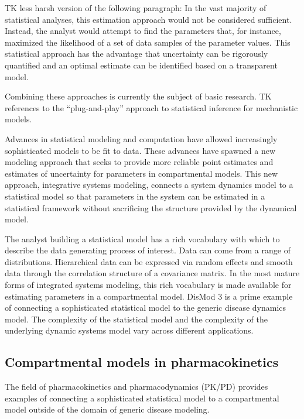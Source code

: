TK less harsh version of the following paragraph: In the vast majority
of statistical analyses, this estimation approach would not be
considered sufficient. Instead, the analyst would attempt to find the
parameters that, for instance, maximized the likelihood of a set of
data samples of the parameter values. This statistical approach has
the advantage that uncertainty can be rigorously quantified and an
optimal estimate can be identified based on a transparent model.

Combining these approaches is currently the subject of basic research.
TK references to the ``plug-and-play'' approach to statistical
inference for mechanistic models.

Advances in statistical modeling and computation have allowed
increasingly sophisticated models to be fit to data. These advances
have spawned a new modeling approach that seeks to provide more
reliable point estimates and estimates of uncertainty for parameters
in compartmental models. This new approach, integrative systems
modeling, connects a system dynamics model to a statistical model so
that parameters in the system can be estimated in a statistical
framework without sacrificing the structure provided by the dynamical
model.

The analyst building a statistical model has a rich vocabulary with
which to describe the data generating process of interest. Data can
come from a range of distributions. Hierarchical data can be expressed
via random effects and smooth data through the correlation structure
of a covariance matrix. In the most mature forms of integrated systems
modeling, this rich vocabulary is made available for estimating
parameters in a compartmental model. DisMod 3 is a prime example of
connecting a sophisticated statistical model to the generic disease
dynamics model. The complexity of the statistical model and the
complexity of the underlying dynamic systems model vary across
different applications.

\subsection{Compartmental models in pharmacokinetics}
The field of pharmacokinetics and pharmacodynamics (PK/PD) provides
examples of connecting a sophisticated statistical model to a
compartmental model outside of the domain of generic disease modeling.

